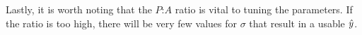 
Lastly, it is worth noting that the $P$:$A$ ratio is vital to tuning the parameters. If the ratio is too high, there will be very few values for $\sigma$ that result in a usable $\hat{y}$. 



